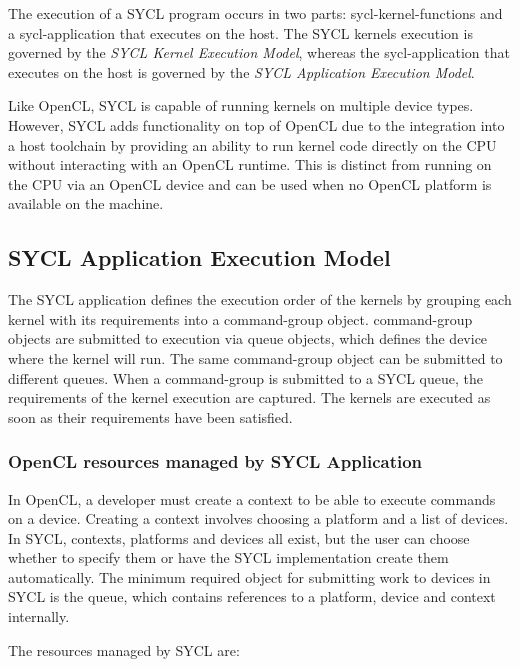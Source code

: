 The execution of a SYCL program occurs in two parts:
\glspl{sycl-kernel-function} and a \gls{sycl-application} that
executes on the \gls{host}.  The SYCL \glspl{kernel} execution is
governed by the \textit{SYCL Kernel Execution Model}, whereas the
\gls{sycl-application} that executes on the \gls{host} is governed by
the \textit{SYCL Application Execution Model}.

Like OpenCL, SYCL is capable of running kernels on multiple device types. 
However, SYCL adds functionality on top of OpenCL due to the integration into a host
toolchain by providing an ability to run kernel code directly on the CPU without
interacting with an OpenCL runtime.
This is distinct from running on the CPU via an OpenCL device and can be used
when no OpenCL platform is available on the machine.

\subsection{SYCL Application Execution Model}
\label{sec:executionmodel}

The SYCL application defines the execution order of the kernels by grouping
each kernel with its requirements into a \gls{command-group} object.
\gls{command-group} objects are submitted to execution via
\gls{queue} objects, which defines the device where the kernel will run.
The same \gls{command-group} object can be submitted to different queues.
When a \gls{command-group} is submitted to a SYCL \gls{queue},  
the requirements of the kernel execution are captured.
The kernels are executed as soon as their requirements have been satisfied.

\subsubsection{OpenCL resources managed by SYCL Application}

In OpenCL, a developer must create a \gls{context} to be able to execute
commands on a device. Creating a context involves choosing a \gls{platform}
and a list of \glspl{device}. In SYCL, contexts, platforms and devices all
exist, but the user can choose whether to specify them or have the SYCL
implementation create them automatically.  The minimum required object for
submitting work to devices in SYCL is the \gls{queue}, which contains
references to a platform, device and context internally.

The resources managed by SYCL are:


